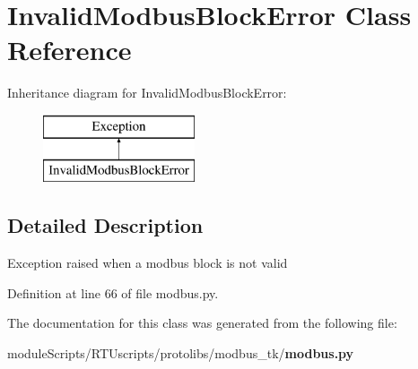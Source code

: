 \section{Invalid\+Modbus\+Block\+Error Class Reference}
\label{classprotolibs_1_1modbus__tk_1_1modbus_1_1_invalid_modbus_block_error}
Inheritance diagram for Invalid\+Modbus\+Block\+Error\+:\begin{figure}[H]
\begin{center}
\leavevmode
\includegraphics[height=2.000000cm]{classprotolibs_1_1modbus__tk_1_1modbus_1_1_invalid_modbus_block_error}
\end{center}
\end{figure}


\subsection{Detailed Description}
\begin{DoxyVerb}Exception raised when a modbus block is not valid\end{DoxyVerb}
 

Definition at line 66 of file modbus.\+py.



The documentation for this class was generated from the following file\+:\begin{DoxyCompactItemize}
\item 
module\+Scripts/\+R\+T\+Uscripts/protolibs/modbus\+\_\+tk/{\bf modbus.\+py}\end{DoxyCompactItemize}
